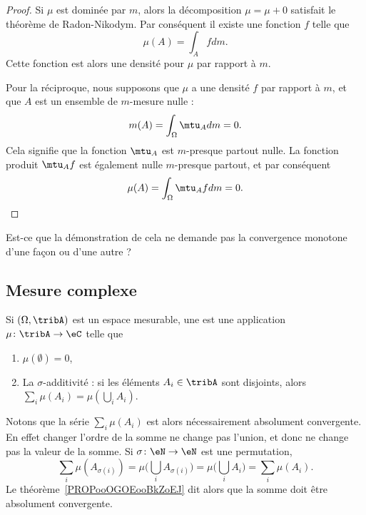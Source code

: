 \begin{proof}
	Si \( \mu\) est dominée par \( m\), alors la décomposition \( \mu=\mu+0\) satisfait le théorème de Radon-Nikodym. Par conséquent il existe une fonction \( f\) telle que
	\begin{equation}
		\mu(A)=\int_Afdm.
	\end{equation}
	Cette fonction est alors une densité pour \( \mu\) par rapport à \( m\).

	Pour la réciproque, nous supposons que \( \mu\) a une densité \( f\) par rapport à \( m\), et que \( A\) est un ensemble de \( m\)-mesure nulle :
	\begin{equation}
		m(A)=\int_{\Omega}\mtu_Adm=0.
	\end{equation}
	Cela signifie que la fonction \( \mtu_A\) est \( m\)-presque partout nulle. La fonction produit \( \mtu_Af\) est également nulle \( m\)-presque partout, et par conséquent
	\begin{equation}
		\mu(A)=\int_{\Omega}\mtu_Afdm=0.
	\end{equation}
\end{proof}

\begin{probleme}
	Est-ce que la démonstration de cela ne demande pas la convergence monotone d'une façon ou d'une autre ?
\end{probleme}

\subsection{Mesure complexe}

\begin{definition} \label{DefGKHLooYjocEt}
	Si \( (\Omega,\tribA)\) est un espace mesurable, une  est une application \( \mu\colon \tribA\to \eC\) telle que
	\begin{enumerate}
		\item
		      \( \mu(\emptyset)=0\),
		\item
		      La \( \sigma\)-additivité : si les éléments \( A_i\in\tribA\) sont disjoints, alors \( \sum_i\mu(A_i)=\mu(\bigcup_iA_i)\).
	\end{enumerate}
\end{definition}
Notons que la série \( \sum_i\mu(A_i)\) est alors nécessairement absolument convergente. En effet changer l'ordre de la somme ne change pas l'union, et donc ne change pas la valeur de la somme. Si \( \sigma\colon \eN\to \eN\) est une permutation,
\begin{equation}
	\sum_i\mu(A_{\sigma(i)})=\mu\big( \bigcup_iA_{\sigma(i)} \big)=\mu\big( \bigcup_iA_i \big)=\sum_i\mu(A_i).
\end{equation}
Le théorème~\ref{PROPooOGOEooBkZoEJ} dit alors que la somme doit être absolument convergente.


